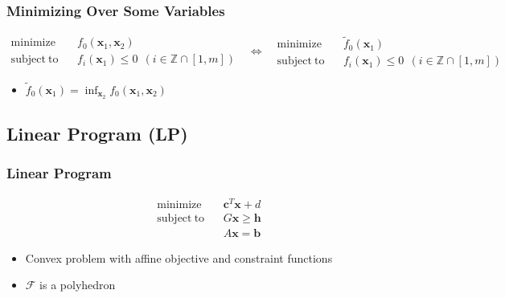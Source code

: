 \subsubsection*{Minimizing Over Some Variables}
$$ \begin{aligned}
    \mathrm{minimize}~~&~~f_0(\mathbf{x}_1, \mathbf{x}_2) \\
    \mathrm{subject~to}~~&~~f_i(\mathbf{x}_1) \leq 0~~(i \in \mathbb{Z} \cap [1,m])
\end{aligned}~~~\Leftrightarrow~~~\begin{aligned}
    \mathrm{minimize}~~&~~\tilde{f}_0(\mathbf{x}_1) \\
    \mathrm{subject~to}~~&~~f_i(\mathbf{x}_1) \leq 0~~(i \in \mathbb{Z} \cap [1,m])
\end{aligned} $$
\begin{itemize}
    \item $\tilde{f}_0(\mathbf{x}_1) = \inf_{\mathbf{x}_2} f_0 (\mathbf{x}_1, \mathbf{x}_2)$
\end{itemize}

\subsection{Linear Program (LP)}

\subsubsection*{Linear Program}
$$ \begin{aligned}
    \mathrm{minimize}~~&~~\mathbf{c}^T \mathbf{x} + d \\
    \mathrm{subject~to}~~&~~G\mathbf{x} \geq \mathbf{h} \\
        &~~A\mathbf{x} = \mathbf{b}
\end{aligned} $$
\begin{itemize}
    \item Convex problem with affine objective and constraint functions
    \item $\mathcal{F}$ is a polyhedron
\end{itemize}

